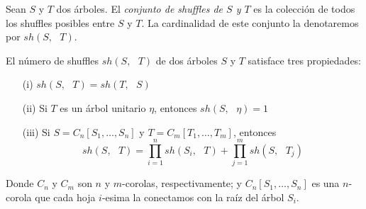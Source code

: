 \documentclass[../main.tex]{subfiles}
\begin{document}
\begin{defi}
    Sean $S$ y $T$ dos \'arboles. El \emph{conjunto de shuffles de $S$ y $T$} es la colecci\'on de todos los shuffles posibles entre $S$ y $T$. La cardinalidad de este conjunto la denotaremos por $sh(S,\text{ }T)$.
\end{defi}
\begin{prop}
    El n\'umero de shuffles $sh(S,\text{ }T)$ de dos \'arboles $S$ y $T$ satisface tres propiedades:
    \begin{enumerate}
        \item[{\rm (i)}] $sh(S, \text{ }T) = sh(T, \text{ }S)$
        \item[{\rm (ii)}] Si $T$ es un \'arbol unitario $\eta$, entonces $sh(S, \text{ }\eta)=1$
        \item[{\rm (iii)}] Si $S=C_n[S_1,\dots,S_n]$ y $T=C_m[T_1,\dots,T_m]$, entonces
              $$
                  sh(S, \text{ }T)  = \prod_{i=1}^n sh(S_i, \text{ }T) + \prod_{j=1}^m sh(S, \text{ }T_j)
              $$
    \end{enumerate}
    Donde $C_n$ y $C_m$ son $n$ y $m$-corolas, respectivamente; y $C_n[S_1,\dots,S_n]$ es una $n$-corola que cada hoja $i$-esima la conectamos con la ra\'iz del \'arbol $S_i$.
\end{prop}
\end{document}
